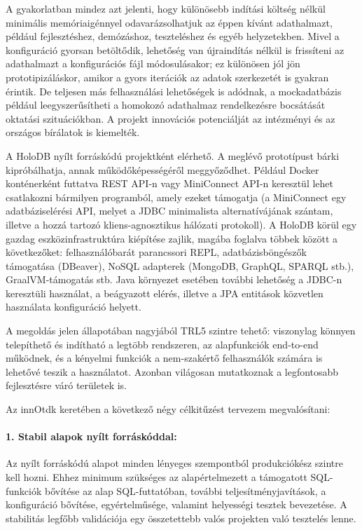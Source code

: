 \documentclass[12pt]{article}
\begin{document}
A gyakorlatban mindez azt jelenti, hogy különösebb indítási költség nélkül minimális memóriaigénnyel odavarázsolhatjuk az éppen kívánt adathalmazt, például fejlesztéshez, demózáshoz, teszteléshez és egyéb helyzetekben.
Mivel a konfiguráció gyorsan betöltődik, lehetőség van újraindítás nélkül is frissíteni az adathalmazt a konfigurációs fájl módosulásakor; ez különösen jól jön prototipizáláskor, amikor a gyors iterációk az adatok szerkezetét is gyakran érintik.
De teljesen más felhasználási lehetőségek is adódnak, a mockadatbázis például leegyszerűsítheti a homokozó adathalmaz rendelkezésre bocsátását oktatási szituációkban.
A projekt innovációs potenciálját az intézményi és az országos bírálatok is kiemelték.

A HoloDB nyílt forráskódú projektként elérhető.
A meglévő prototípust bárki kipróbálhatja, annak működőképességéről meggyőződhet.
Például Docker konténerként futtatva REST API-n vagy MiniConnect API-n keresztül lehet csatlakozni bármilyen programból, amely ezeket támogatja
(a MiniConnect egy adatbáziselérési API, melyet a JDBC minimalista alternatívájának szántam, illetve a hozzá tartozó kliens-agnosztikus hálózati protokoll).
A HoloDB körül egy gazdag eszközinfrastruktúra kiépítése zajlik, magába foglalva többek között a következőket: felhasználóbarát parancssori REPL, adatbázisböngészők támogatása (DBeaver), NoSQL adapterek (MongoDB, GraphQL, SPARQL stb.), GraalVM-támogatás stb.
Java környezet esetében további lehetőség a JDBC-n keresztüli használat,
a beágyazott elérés, illetve a JPA entitások közvetlen használata konfiguráció helyett.

A megoldás jelen állapotában nagyjából TRL5 szintre tehető:
viszonylag könnyen telepíthető és indítható a legtöbb rendszeren,
az alapfunkciók end-to-end működnek,
és a kényelmi funkciók a nem-szakértő felhasználók számára is lehetővé teszik a használatot.
Azonban világosan mutatkoznak a legfontosabb fejlesztésre váró területek is.

Az innOtdk keretében a következő négy célkitűzést tervezem megvalósítani:

\paragraph{1. Stabil alapok nyílt forráskóddal:}{
Az nyílt forráskódú alapot minden lényeges szempontból produkciókész szintre kell hozni.
Ehhez minimum szükséges az alapértelmezett a támogatott SQL-funkciók bővítése az alap SQL-futtatóban,
további teljesítményjavítások,
a konfiguráció bővítése, egyértelműsége,
valamint helyességi tesztek bevezetése.
A stabilitás legfőbb validációja egy összetettebb valós projekten való tesztelés lenne.
}
\end{document}
